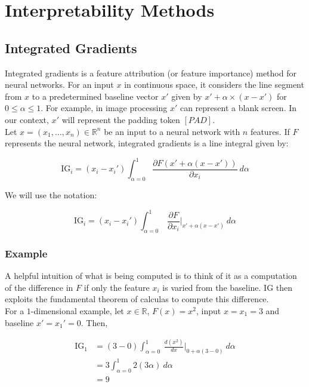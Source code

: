 \documentclass{article}
\begin{document}
\section{Interpretability Methods}

\subsection{Integrated Gradients}

\indent Integrated gradients is a feature attribution (or feature importance) method for neural networks.  For an input $x$ in continuous space, it considers the line segment from $x$ to a predetermined baseline vector $x'$ given by $x' + \alpha \times (x - x')$ for $0 \leq \alpha \leq 1$.  For example, in image processing $x'$ can represent a blank screen.  In our context, $x'$ will represent the padding token $[PAD]$. \\

Let $x = (x_1, \ldots, x_n) \in \mathbb{R}^n$ be an input to a neural network with $n$ features.  If $F$ represents the neural network, integrated gradients is a line integral given by:

\begin{equation}
\text{IG}_i = (x_i - x_i') \int_{\alpha=0}^{1} \frac{\partial F(x' + \alpha (x - x'))}{\partial x_i} \ d\alpha
\end{equation}

\noindent We will use the notation:

\begin{equation}
\text{IG}_i = (x_i - x_i') \int_{\alpha=0}^{1} \ \frac{\partial F}{\partial x_i} \Big|_{x' + \alpha (x - x')} \ d\alpha
\end{equation}

\subsubsection*{Example}

A helpful intuition of what is being computed is to think of it as a computation of the difference in $F$ if only the feature $x_i$ is varied from the baseline.  IG then exploits the fundamental theorem of calculas to compute this difference.  \\

For a $1$-dimensional example, let $x \in \mathbb{R}$, $F(x) = x^2$, input $x = x_1 =3$ and baseline $x'= x_1'= 0$.  Then,
    
\begin{align*}
    \text{IG}_1 &= (3 - 0) \int_{\alpha=0}^{1} \ \frac{d (x^2)}{d x} \Big|_{0 + \alpha (3 - 0)} \ d\alpha \\
    &= 3 \int_{\alpha=0}^{1} 2(3\alpha) \ d\alpha \\
    &= 9
\end{align*}
\end{document}

